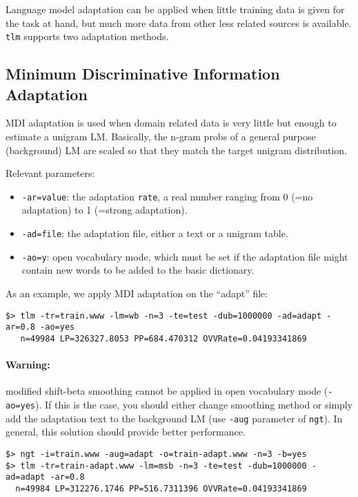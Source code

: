 Language model adaptation can be  applied when little training data is given for the 
task at hand, but much more data from other less related sources is available.  {\tt tlm} supports two adaptation methods.

\subsection{Minimum Discriminative Information Adaptation}
MDI adaptation  is used  when domain related  data is very  little but
enough to  estimate a  unigram LM.  Basically,  the n-gram probs  of a
general  purpose (background)  LM are  scaled so  that they  match the
target unigram distribution.
	
\noindent	 
Relevant parameters:
\begin{itemize}
\item {\tt -ar=value}: the adaptation {\tt rate},  a real number ranging 
 from 0 (=no adaptation) to 1 (=strong adaptation).

\item {\tt -ad=file}: the  adaptation file,  either a text  or a
  unigram table.

\item {\tt -ao=y}: open vocabulary mode, which  must be set if the adaptation file
 might contain new words to be added to the basic dictionary.
\end{itemize}

\noindent
As an example, we apply MDI adaptation on the ``adapt'' file:
\begin{small}
\begin{verbatim}
$> tlm -tr=train.www -lm=wb -n=3 -te=test -dub=1000000 -ad=adapt -ar=0.8 -ao=yes
   n=49984 LP=326327.8053 PP=684.470312 OVVRate=0.04193341869
\end{verbatim}
\end{small}

\noindent
\paragraph{Warning:}  modified shift-beta  smoothing  cannot  be applied  in  open
vocabulary mode  ({\tt -ao=yes}).  If  this is the  case, you  should either
change  smoothing method  or simply  add  the adaptation  text to  the
background LM (use {\tt -aug} parameter  of {\tt ngt}). In
general, this solution should  provide better performance.
\begin{small}
\begin{verbatim}
$> ngt -i=train.www -aug=adapt -o=train-adapt.www -n=3 -b=yes
$> tlm -tr=train-adapt.www -lm=msb -n=3 -te=test -dub=1000000 -ad=adapt -ar=0.8
  n=49984 LP=312276.1746 PP=516.7311396 OVVRate=0.04193341869
\end{verbatim}
\end{small}

